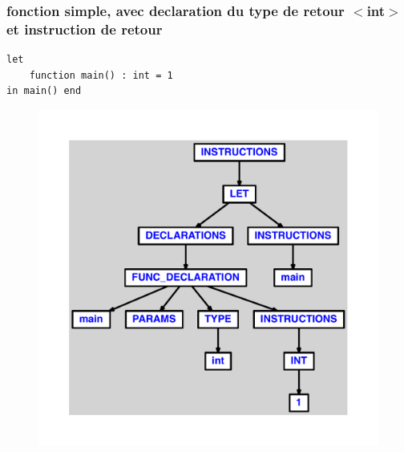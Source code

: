 \documentclass{article}
\begin{document}
\subsubsection{fonction simple, avec declaration du type de retour $ < $int$ > $ et instruction de retour}
\begin{lstlisting}
let
	function main() : int = 1
in main() end
\end{lstlisting}
\newpage
\begin{figure}[H]
\centering
\includegraphics[max width=\textwidth]{ast/ast_231.pdf}
\end{figure}
\newpage
\end{document}
